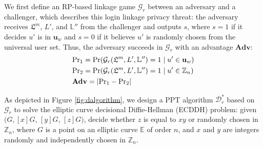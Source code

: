 We first define an RP-based linkage game $\mathcal{G}_r$ between an adversary and a challenger, which describes this login linkage privacy threat: the adversary receives $\mathfrak{L}^m$, $L'$, and $\mathbb{L}''$ from the challenger and outputs $s$, where $s = 1$ if it decides $u'$ is in $\mathbf{u}_w$ %
and $s=0$ if it believes $u'$ is randomly chosen from the universal user set.
Thus, the adversary succeeds in $\mathcal{G}_r$ with an advantage $\mathbf{Adv}$:
\begin{align*}
&{\rm Pr}_1={\rm Pr}(\mathcal{G}_r(\mathfrak{L}^m, L', \mathbb{L}'')=1 \;| \; u' \in \mathbf{u}_w)  \\
&{\rm Pr}_2={\rm Pr}(\mathcal{G}_r(\mathfrak{L}^m, L', \mathbb{L}'')=1 \; | \; u' \in \mathbb{Z}_n)\\
&{\mathbf{Adv}}=|{\rm Pr}_1-{\rm Pr}_2|
\end{align*}

As depicted in Figure \ref{fig:dalgorithm}, we design a PPT algorithm $\mathcal{D}^*_r$ based on $\mathcal{G}_r$ to solve the elliptic curve decisional Diffie-Hellman (ECDDH) problem: given $(G, [x]G$, $[y]G$, $[z]G)$, decide whether $z$ is equal to $xy$ or randomly chosen in $\mathbb{Z}_n$, where $G$ is a point on an elliptic curve $\mathbb{E}$ of order $n$, and $x$ and $y$ are integers randomly and independently chosen in $\mathbb{Z}_n$.


